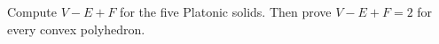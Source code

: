 Compute $ V-E+F $ for the five Platonic solids. Then prove $ V-E+F=2 $ for every convex polyhedron.
